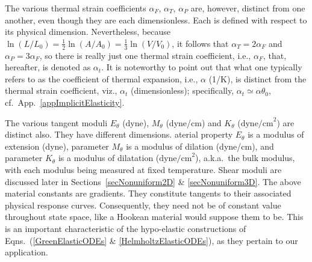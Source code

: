 The various thermal strain coefficients $\alpha_F$, $\alpha_T$, $\alpha_P$ are, however, distinct from one another, even though they are each dimensionless.  Each is defined with respect to its physical dimension.  Nevertheless, because $\ln(L / L_0) = \tfrac{1}{2} \ln (A / \! A_0) = \tfrac{1}{3} \ln (V \! / V_0)$, it follows that $\alpha_T = 2 \alpha_F$ and $\alpha_P = 3 \alpha_F$, so there is really just one thermal strain coefficient, i.e., $\alpha_F$, that, hereafter, is denoted as $\alpha_t$.  It is noteworthy to point out that what one typically refers to as the coefficient of thermal expansion, i.e., $\alpha$ (1/K), is distinct from the thermal strain coefficient, viz., $\alpha_t$ (dimensionless); specifically, $\alpha_t \simeq \alpha \theta_0$, cf.\ App.~\ref{appImplicitElasticity}.

The various tangent moduli $E_{\theta}$ (dyne), $M_{\theta}$ (dyne/cm) and $K_{\theta}$ ($\mathrm{dyne/cm}^2$) are distinct also.  They have different dimensions.  
aterial property $E_{\theta}$ is a modulus of extension (dyne), parameter $M_{\theta}$ is a modulus of dilation (dyne/cm), and parameter $K_{\theta}$ is a modulus of dilatation ($\mathrm{dyne/cm}^2$), a.k.a.\ the bulk modulus, with each modulus being measured at fixed temperature.  Shear moduli are discussed later in Sections~\ref{secNonuniform2D} \& \ref{secNonuniform3D}.  The above material constants are gradients.  They constitute tangents to their associated physical response curves.  Consequently, they need not be of constant value throughout state space, like a Hookean material would suppose them to be.  This is an important characteristic of the hypo-elastic constructions of Eqns.~(\ref{GreenElasticODEs} \& \ref{HelmholtzElasticODEs}), as they pertain to our application. 

